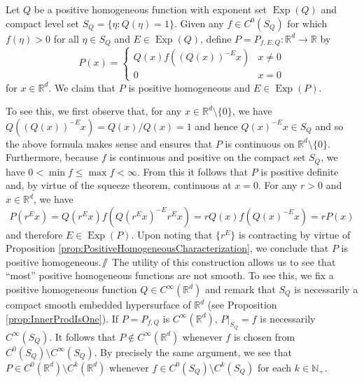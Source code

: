 \documentclass[smallextended]{svjour3}
\theoremstyle{remark}
\renewcommand*{\qedsymbol}{\hfill$\mathbin{/\mkern-6mu/}$}
\renewenvironment{subproof}[1][\proofname]{\renewcommand\xsubproofname{#1}\xsubproof}{\endxsubproof}
\newcommand\Exp{\operatorname{Exp}}
\begin{document}
\begin{example}\label{exp:Weierstrass}\normalfont
Let $Q$ be a positive homogeneous function with exponent set $\Exp(Q)$ and compact level set $S_Q=\{\eta:Q(\eta)=1\}$. Given any $f\in C^0(S_Q)$ for which $f(\eta)>0$ for all $\eta\in S_Q$ and $E\in \Exp(Q)$, define $P=P_{f,E,Q}:\mathbb{R}^d\to\mathbb{R}$ by
\begin{equation*}
P(x)=\begin{cases}
Q(x)f\left((Q(x))^{-E}x\right) & x\neq 0\\
0 & x=0
\end{cases}
\end{equation*}
for $x\in\mathbb{R}^d$. We claim that $P$ is positive homogeneous and $E\in\Exp(P)$.

\begin{subproof}[Proof] 
To see this, we first observe that, for any $x\in\mathbb{R}^d\setminus \{0\}$, we have $Q((Q(x))^{-E}x)=Q(x)/Q(x)=1$ and hence $Q(x)^{-E}x\in S_Q$ and so the above formula makes sense and ensures that $P$ is continuous on $\mathbb{R}^d\setminus\{0\}$. Furthermore, because $f$ is continuous and positive on the compact set $S_Q$, we have $0<\min f\leq \max f<\infty$. From this it follows that $P$ is positive definite and, by virtue of the squeeze theorem, continuous at $x=0$. For any $r>0$ and $x\in\mathbb{R}^d$, we have
\begin{equation*}
P(r^Ex)=Q(r^Ex)f(Q(r^Ex)^{-E}r^Ex)=rQ(x)f(Q(x)^{-E}x)=rP(x)
\end{equation*}
and therefore $E\in\Exp(P)$. Upon noting that $\{r^E\}$ is contracting by virtue of Proposition \ref{prop:PositiveHomogeneousCharacterization}, we conclude that $P$ is positive homogeneous.\qedsymbol
\end{subproof}
\noindent The utility of this construction allows us to see that ``most'' positive homogeneous functions are not smooth. To see this, we fix a positive homogeneous function $Q\in C^{\infty}(\mathbb{R}^d)$ and remark that $S_Q$ is necessarily a compact smooth embedded hypersurface of $\mathbb{R}^d$ (see Proposition \ref{prop:InnerProdIsOne}). If $P=P_{f,Q}$ is $C^\infty(\mathbb{R}^d)$, $P\vert_{S_Q}=f$ is necessarily $C^\infty(S_Q)$. It follows that $P\notin C^\infty(\mathbb{R}^d)$ whenever $f$ is chosen from $C^0(S_Q)\setminus C^\infty(S_Q)$. By precisely the same argument, we see that $P\in C^0(\mathbb{R}^d)\setminus C^k(\mathbb{R}^d)$ whenever $f\in C^0(S_Q)\setminus C^k(S_Q)$ for each $k\in\mathbb{N}_+$.\\


\end{example}
\end{document}
